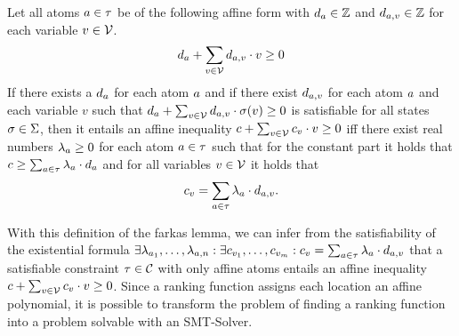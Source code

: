 \begin{definition}
  Let all atoms $a \in \tau$ be of the following affine form with $d_a \in \mathbb{Z}$ and $d_{a,v} \in \mathbb{Z}$ for each variable $v \in \mathcal{V}$.
  \[ d_a + \sum_{v \in \mathcal{V}} d_{a,v} \cdot v \geq 0 \]
  If there exists a $d_a$ for each atom $a$ and if there exist $d_{a,v}$ for each atom $a$ and each variable $v$ such that $d_a + \sum_{v \in \mathcal{V}} d_{a,v} \cdot \sigma(v) \geq 0$ is satisfiable for all states $\sigma \in \Sigma$, then it entails an affine inequality $c + \sum_{v \in \mathcal{V}} c_v \cdot v \geq 0$ iff there exist real numbers $\lambda_a \geq 0$ for each atom $a \in \tau$ such that for the constant part it holds that $c \geq \sum_{a \in \tau} \lambda_a \cdot d_a$ and for all variables $v \in \mathcal{V}$ it holds that
  \[ c_v = \sum_{a \in \tau} \lambda_a \cdot d_{a,v}. \]
\end{definition}
With this definition of the farkas lemma, we can infer from the satisfiability of the existential formula $\exists \lambda_{a_1}, \dots, \lambda_{a,n}: \exists c_{v_1}, \dots, c_{v_m}: c_v = \sum_{a \in \tau} \lambda_a \cdot d_{a,v}$ that a satisfiable constraint $\tau \in \mathcal{C}$ with only affine atoms entails an affine inequality $c + \sum_{v \in \mathcal{V}} c_v \cdot v \geq 0$.
Since a ranking function assigns each location an affine polynomial, it is possible to transform the problem of finding a ranking function into a problem solvable with an SMT-Solver.
